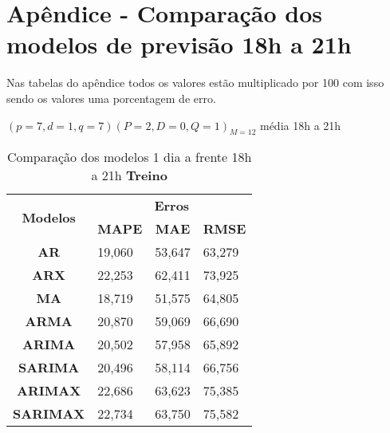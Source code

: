 
\section{Ap\^endice - Compara\c c\~ao dos modelos de previs\~ao 18h a 21h}\label{sec:comtb18}

Nas tabelas do apêndice todos os valores estão multiplicado por 100 com isso sendo os valores uma porcentagem de erro.

	$(p = 7,d = 1,q = 7) (P = 2,D = 0,Q = 1)_{M = 12}$ média 18h a 21h
	\begin{table}[H]
		\centering
		\caption{Comparação dos modelos 1 dia a frente 18h a 21h \textbf{Treino} }\label{tb:1-18trn}
\begin{tabular}{@{}clll@{}}
	\toprule
	\multirow{2}{*}{\textbf{Modelos}} & \multicolumn{3}{c}{\textbf{Erros}}                                                                       \\ \cmidrule(l){2-4} 
	& \multicolumn{1}{c}{\textbf{MAPE}} & \multicolumn{1}{c}{\textbf{MAE}} & \multicolumn{1}{c}{\textbf{RMSE}} \\ \hline
	\textbf{AR}                       & 19,060                            & 53,647                           & 63,279                            \\
	\textbf{ARX}                      & 22,253                            & 62,411                           & 73,925                            \\
	\textbf{MA}                       & 18,719                            & 51,575                           & 64,805                            \\
	\textbf{ARMA}                     & 20,870                            & 59,069                           & 66,690                            \\
	\textbf{ARIMA}                    & 20,502                            & 57,958                           & 65,892                            \\
	\textbf{SARIMA}                   & 20,496                            & 58,114                           & 66,756                            \\
	\textbf{ARIMAX}                   & 22,686                            & 63,623                           & 75,385                            \\
	\textbf{SARIMAX}                  & 22,734                            & 63,750                           & 75,582                            \\

\end{tabular}
\end{table}
